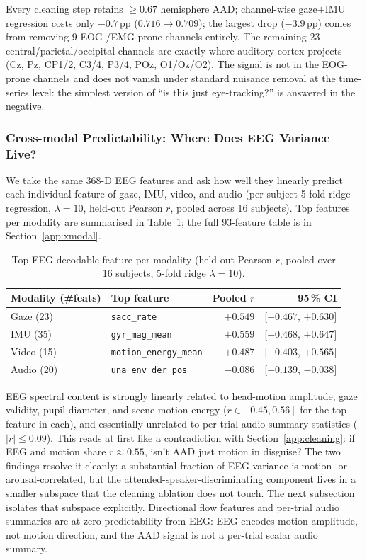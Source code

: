\documentclass{article}
\begin{document}
Every cleaning step retains $\ge 0.67$ hemisphere AAD; channel-wise
gaze$+$IMU regression costs only $-0.7$\,pp ($0.716 \to 0.709$); the
largest drop ($-3.9$\,pp) comes from removing 9 EOG-/EMG-prone channels
entirely. The remaining 23 central/parietal/occipital channels are exactly
where auditory cortex projects (Cz, Pz, CP1/2, C3/4, P3/4, POz, O1/Oz/O2).
The signal is not in the EOG-prone channels and does not vanish under
standard nuisance removal at the time-series level: the simplest version of
``is this just eye-tracking?'' is answered in the negative.

\subsubsection{Cross-modal Predictability: Where Does EEG Variance Live?}
\label{app:xmodal_diag}

We take the same 368-D EEG features and ask how well they linearly predict
each individual feature of gaze, IMU, video, and audio (per-subject 5-fold
ridge regression, $\lambda{=}10$, held-out Pearson $r$, pooled across 16
subjects). Top features per modality are summarised in
Table~\ref{tab:xmodal_diag}; the full 93-feature table is in
Section~\ref{app:xmodal}.

\begin{table}[ht]
\centering
\small
\caption{Top EEG-decodable feature per modality (held-out Pearson $r$,
pooled over 16 subjects, 5-fold ridge $\lambda{=}10$).}
\label{tab:xmodal_diag}
\begin{tabular}{llrr}
\toprule
Modality (\#feats) & Top feature & Pooled $r$ & 95\,\% CI \\
\midrule
Gaze (23)  & \texttt{sacc\_rate}           & $+0.549$ & [$+0.467$, $+0.630$] \\
IMU (35)   & \texttt{gyr\_mag\_mean}       & $+0.559$ & [$+0.468$, $+0.647$] \\
Video (15) & \texttt{motion\_energy\_mean} & $+0.487$ & [$+0.403$, $+0.565$] \\
Audio (20) & \texttt{una\_env\_der\_pos}   & $-0.086$ & [$-0.139$, $-0.038$] \\
\bottomrule
\end{tabular}
\end{table}

EEG spectral content is strongly linearly related to head-motion amplitude,
gaze validity, pupil diameter, and scene-motion energy ($r \in [0.45, 0.56]$
for the top feature in each), and essentially unrelated to per-trial audio
summary statistics ($|r| \le 0.09$). This reads at first like a contradiction
with Section~\ref{app:cleaning}: if EEG and motion share $r{\approx}0.55$,
isn't AAD just motion in disguise? The two findings resolve it cleanly: a
substantial fraction of EEG variance is motion- or arousal-correlated, but
the attended-speaker-discriminating component lives in a smaller subspace
that the cleaning ablation does not touch. The next subsection isolates that
subspace explicitly. Directional flow features and per-trial audio summaries
are at zero predictability from EEG: EEG encodes motion amplitude, not
motion direction, and the AAD signal is not a per-trial scalar audio summary.
\end{document}

